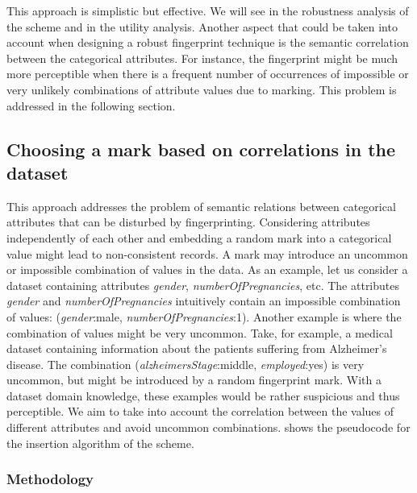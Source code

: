 This approach is simplistic but effective. 
We will see in  the robustness analysis of the scheme and in  the utility analysis.
Another aspect that could be taken into account when designing a robust fingerprint technique is the semantic correlation between the categorical attributes. 
For instance, the fingerprint might be much more perceptible when there is a frequent number of occurrences of impossible or very unlikely combinations of attribute values due to marking.
This problem is addressed in the following section.


\subsection{Choosing a mark based on correlations in the dataset}
This approach addresses the problem of semantic relations between categorical attributes that can be disturbed by fingerprinting. 
Considering attributes independently of each other and embedding a random mark into a categorical value might lead to non-consistent records. 
A mark may introduce an uncommon or impossible combination of values in the data. 
As an example, let us consider a dataset containing attributes \textit{gender}, \textit{numberOfPregnancies}, etc. The attributes \textit{gender} and \textit{numberOfPregnancies} intuitively contain an impossible combination of values: (\textit{gender}:male, \textit{numberOfPregnancies}:1).
Another example is where the combination of values might be very uncommon. Take, for example, a medical dataset containing information about the patients suffering from Alzheimer's disease. The combination 
(\textit{alzheimersStage}:middle, \textit{employed}:yes) is very uncommon, but might be introduced by a random fingerprint mark.
With a dataset domain knowledge, these examples would be rather suspicious and thus perceptible. 
We aim to take into account the correlation between the values of different attributes and avoid uncommon combinations. 
 shows the pseudocode for the insertion algorithm of the scheme.

\subsubsection{Methodology}
